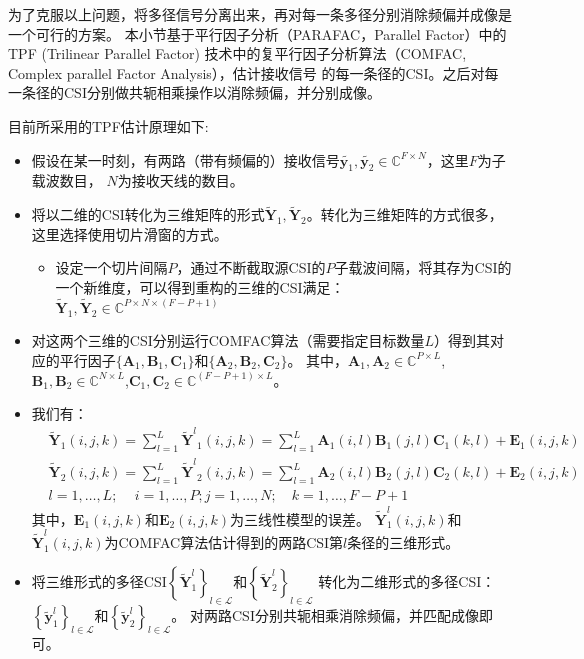 为了克服以上问题，将多径信号分离出来，再对每一条多径分别消除频偏并成像是一个可行的方案。
本小节基于平行因子分析（PARAFAC，Parallel Factor）中的TPF (Trilinear Parallel Factor)
技术中的复平行因子分析算法（COMFAC, Complex parallel Factor Analysis）\cite{bro1999fast}，估计接收信号
的每一条径的CSI\cite{TPF}。之后对每一条径的CSI分别做共轭相乘操作以消除频偏，并分别成像。


目前所采用的TPF估计原理如下:
\begin{itemize}
  \item 假设在某一时刻，有两路（带有频偏的）接收信号$\widetilde{\boldsymbol{y}_1},\widetilde{\boldsymbol{y}_2} \in \mathbb{C}^{F\times N}$，这里$F$为子载波数目，
  $N$为接收天线的数目。
  \item 将以二维的CSI转化为三维矩阵的形式$\widetilde{\boldsymbol{Y}}_1,\widetilde{\boldsymbol{Y}}_2$。转化为三维矩阵的方式很多，这里选择使用切片滑窗的方式。
  \begin{itemize}
    \item 设定一个切片间隔$P$，通过不断截取源CSI的$P$子载波间隔，将其存为CSI的一个新维度，可以得到重构的三维的CSI满足：
    $\widetilde{\boldsymbol{Y}}_1,\widetilde{\boldsymbol{Y}}_2 \in \mathbb{C}^{P\times N \times (F-P+1)}$
  \end{itemize}
  \item 对这两个三维的CSI分别运行COMFAC算法（需要指定目标数量$L$）得到其对应的平行因子$\{\boldsymbol{A}_1,\boldsymbol{B}_1,\boldsymbol{C}_1\}$和$\{\boldsymbol{A}_2,\boldsymbol{B}_2,\boldsymbol{C}_2\}$。
  其中，$\boldsymbol{A}_1,\boldsymbol{A}_2\in \mathbb{C}^{P\times L}$,$\boldsymbol{B}_1,\boldsymbol{B}_2\in \mathbb{C}^{N \times L}$,$\boldsymbol{C}_1,\boldsymbol{C}_2\in \mathbb{C}^{(F-P+1)\times L}$。
  \item 我们有：
  \begin{align}
    &{\widetilde {\boldsymbol{Y}}_1}(i,j,k) = \sum\limits_{l = 1}^L {{{\widetilde {\boldsymbol{Y}}}^l}_1(i,j,k)}  = \sum\limits_{l = 1}^L {{{\boldsymbol{A}}_1}(i,l){{\boldsymbol{B}}_1}(j,l){{\boldsymbol{C}}_1}(k,l) + {{\boldsymbol{E}}_1}(i,j,k)} \nonumber \\
    &{\widetilde {\boldsymbol{Y}}_2}(i,j,k) = \sum\limits_{l = 1}^L {{{\widetilde {\boldsymbol{Y}}}^l}_2(i,j,k)}  = \sum\limits_{l = 1}^L {{{\boldsymbol{A}}_2}(i,l){{\boldsymbol{B}}_2}(j,l){{\boldsymbol{C}}_2}(k,l) + {{\boldsymbol{E}}_2}(i,j,k)} \nonumber \\
    &l = 1, \ldots ,L;\quad \,i = 1, \ldots ,P;j = 1, \ldots ,N;\quad k = 1, \ldots ,F - P + 1
    \label{TPF_decomp}
  \end{align}
  其中，$\boldsymbol{E}_1(i,j,k)$和$\boldsymbol{E}_2(i,j,k)$为三线性模型的误差。
  $\widetilde{\boldsymbol{Y}}^l_1(i,j,k)$和$\widetilde{\boldsymbol{Y}}^l_1(i,j,k)$为COMFAC算法估计得到的两路CSI第$l$条径的三维形式。
  \item 将三维形式的多径CSI$\left\{\tilde{\boldsymbol{Y}}^l_1\right\}_{l\in\mathcal{L}}$和$\left\{\tilde{\boldsymbol{Y}}^l_2\right\}_{l\in\mathcal{L}}$ 
  转化为二维形式的多径CSI：$\left\{\tilde{\boldsymbol{y}}^l_1\right\}_{l\in\mathcal{L}}$和$\left\{\tilde{\boldsymbol{y}}^l_2\right\}_{l\in\mathcal{L}}$。
  对两路CSI分别共轭相乘消除频偏，并匹配成像即可。
\end{itemize}
